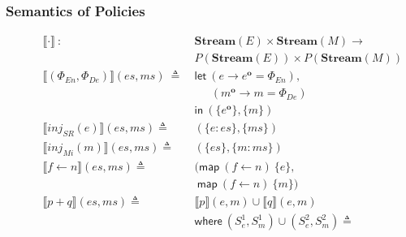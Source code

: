 \documentclass[sigconf,usenames,dvipsnames,svgnames,table]{acmart}
\newcommand{\interp}[1]{\llbracket #1 \rrbracket}
\newcommand{\obf}[1]{#1^\mathbf{o}}
\begin{document}
      \subsubsection{Semantics of Policies}\label{sec:spec:sem:pol}
        \begin{figure}
          \centering
          { %
          \begin{align*}
            \interp { \cdot }\ 
              :\ \ &
              \mathbf{Stream}(E)\times \mathbf{Stream}(M) \rightarrow \\
              & P(\mathbf{Stream}(E))\times P(\mathbf{Stream}(M)) 
              \\\hline
            \interp {(\Phi_{En}, \Phi_{De})}(es, ms)\
              \triangleq\
              & \mathsf{let}\ (e \rightarrow \obf{e} = \Phi_{En}),\\
              & \quad\ \      (\obf{m} \rightarrow m = \Phi_{De}) \\
              & \mathsf{in}\
              (\{\obf{e}\}, \{m\})
              \\
            \interp { inj_{SR}(e) }(es, ms)
              \triangleq\ &
              (\{e : es\}, \{ms\}) 
              \\
            \interp { inj_{Mi}(m) }(es, ms)
              \triangleq\ &
              (\{es\},\{m : ms\})
              \\
            \interp { f \leftarrow n }(es, ms)
              \triangleq\ 
              & (\mathsf{map}\ (f\leftarrow n)\ \{e\},\\
              &\ \mathsf{map}\ (f\leftarrow n)\ \{m\})
              \\ %
            \interp { p + q }(es, ms)
              \triangleq\ &
              \interp { p }(e, m)\cup
              \interp { q }(e, m) \\
              &\mathsf{where}\ (S_e^1, S_m^1)\cup (S_e^2, S_m^2)\triangleq\\

\end{align*}}
\end{figure}
\end{document}
